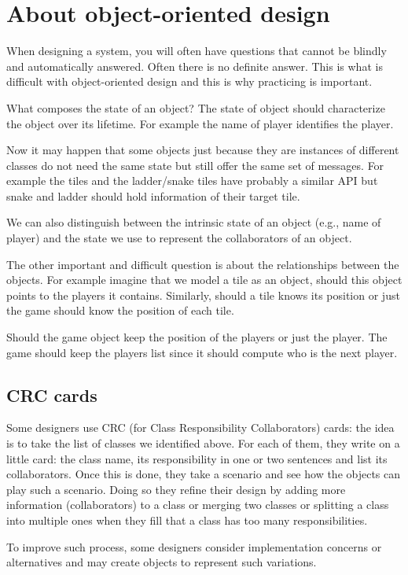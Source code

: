 \documentclass[10pt,twoside,english]{_support/latex/sbabook/sbabook}
\begin{document}
\section{About object-oriented design}
When designing a system, you will often have questions that cannot be blindly and automatically answered. Often there is no definite answer. This is what is difficult with object-oriented design and this is why practicing is important. 

What composes the state of an object?
The state of object should characterize the object over its lifetime. For example the name of  player identifies the player.

Now it may happen that some objects just because they are instances of different classes
do not need the same state but still offer the same set of messages. For example the tiles and the ladder/snake tiles have probably a similar API but snake and ladder should hold information of their target tile.

We can also distinguish between the intrinsic state of an object (e.g., name of player) and the state we use to represent the collaborators of an object. 

The other important and difficult question is about the relationships between the objects. 
For example imagine that we model a tile as an object, should this object points to the players it contains. Similarly, should a tile knows its position or just the game should know the position of each tile. 

Should the game object keep the position of the players or just the player. 
The game should keep the players list since it should compute who is the next player.
\subsection{CRC cards}
Some designers use CRC (for Class Responsibility Collaborators) cards: 
the idea is to take the list of classes we identified above. For each of them, they write on a little card: the class name, its responsibility in one or two sentences and list its collaborators. Once this is done, they take a scenario and see how the objects can play such a scenario. Doing so they refine their design by adding more information (collaborators) to a class or merging two classes or splitting a class into multiple ones when they fill that a class has too many responsibilities. 

To improve such process, some designers consider implementation concerns 
or alternatives and may create objects to represent such variations.
\end{document}
